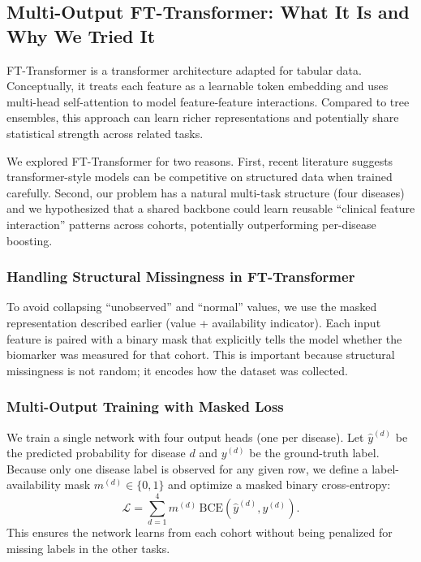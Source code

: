 \documentclass[journal]{IEEEtran}
\begin{document}
\subsection{Multi-Output FT-Transformer: What It Is and Why We Tried It}
FT-Transformer is a transformer architecture adapted for tabular data. Conceptually, it treats each feature as a learnable token embedding and uses multi-head self-attention to model feature-feature interactions. Compared to tree ensembles, this approach can learn richer representations and potentially share statistical strength across related tasks.

We explored FT-Transformer for two reasons. First, recent literature suggests transformer-style models can be competitive on structured data when trained carefully. Second, our problem has a natural multi-task structure (four diseases) and we hypothesized that a shared backbone could learn reusable ``clinical feature interaction'' patterns across cohorts, potentially outperforming per-disease boosting.

\subsubsection{Handling Structural Missingness in FT-Transformer}
To avoid collapsing ``unobserved'' and ``normal'' values, we use the masked representation described earlier (value + availability indicator). Each input feature is paired with a binary mask that explicitly tells the model whether the biomarker was measured for that cohort. This is important because structural missingness is not random; it encodes how the dataset was collected.

\subsubsection{Multi-Output Training with Masked Loss}
We train a single network with four output heads (one per disease). Let $\hat{y}^{(d)}$ be the predicted probability for disease $d$ and $y^{(d)}$ be the ground-truth label. Because only one disease label is observed for any given row, we define a label-availability mask $m^{(d)} \in \{0,1\}$ and optimize a masked binary cross-entropy:
\begin{equation}
\mathcal{L} = \sum_{d=1}^{4} m^{(d)}\,\mathrm{BCE}(\hat{y}^{(d)}, y^{(d)}).
\end{equation}
This ensures the network learns from each cohort without being penalized for missing labels in the other tasks.
\end{document}
